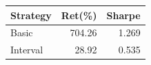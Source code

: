 {\tiny\setlength{\tabcolsep}{2pt}\begin{tabular}{lrr} \toprule
Strategy & Ret(\%) & Sharpe \\ \midrule
Basic & 704.26 & 1.269 \\ 
Interval & 28.92 & 0.535 \\ 
\bottomrule \end{tabular}}